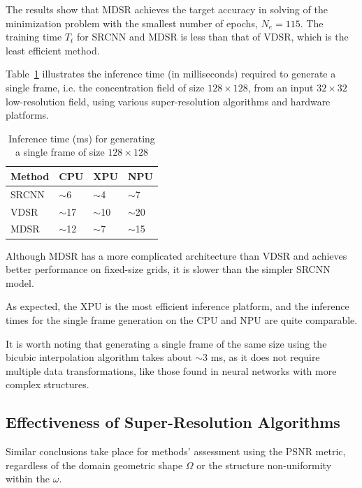 \documentclass{ieeeaccess}
\begin{document}
The results show that MDSR achieves the target accuracy in solving of the minimization problem with the smallest number of epochs, $N_e=115$. The training time $T_t$ for SRCNN and MDSR is less than that of VDSR, which is the least efficient method.

Table~\ref{tab:k6t} illustrates the inference time (in milliseconds) required to generate  a single frame, i.e. the concentration field of size $128 \times 128$, from an input $32 \times 32$ low-resolution field, using various super-resolution algorithms and hardware platforms.

\begin{table}[ht]
\caption{Inference time (ms) for generating a single frame of size $128 \times 128$ }
\setlength{\tabcolsep}{3pt}
\begin{tabular}{|p{60pt}|p{50pt}|p{50pt}|p{50pt}|}
\hline
Method & CPU & XPU & NPU \\
\hline
SRCNN & $\sim$6  & $\sim$4  & $\sim$7  \\
VDSR  & $\sim$17 & $\sim$10 & $\sim$20 \\
MDSR  & $\sim$12 & $\sim$7  & $\sim$15 \\
\hline
\end{tabular}
\label{tab:k6t}
\end{table}

Although MDSR has a more complicated architecture than VDSR and achieves better performance on fixed-size grids, it is  slower than the simpler SRCNN model. 

As expected, the XPU is the most efficient inference platform, and the inference times for the single frame generation on the CPU and NPU are quite comparable.

It is worth noting that generating a single frame of the same size using the bicubic interpolation algorithm takes about $\sim$3 ms, as it does not  require  multiple data transformations, like those found in neural networks with more complex structures.

\subsection{Effectiveness of Super-Resolution Algorithms}

Similar conclusions take place for methods' assessment using the PSNR metric, regardless of the domain geometric shape $\Omega$ or the structure non-uniformity within the $\omega$. 
\end{document}
